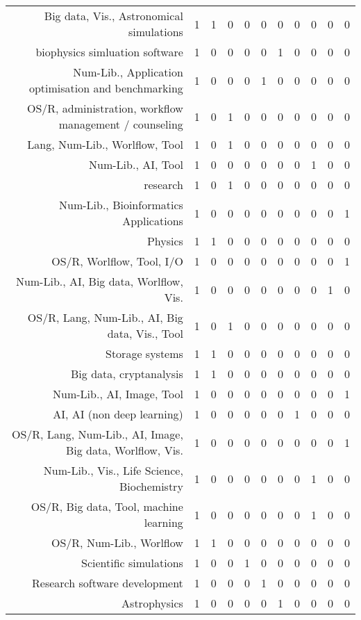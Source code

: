 {\begin{landscape}
\begin{longtable}[htb]{r|c|c|c|c|c|c|c|c|c|c}
{Big data, Vis., Astronomical simulations} & 1 & 1 & 0 & 0 & 0 & 0 & 0 & 0 & 0 & 0 \\%
{biophysics simluation software} & 1 & 0 & 0 & 0 & 0 & 1 & 0 & 0 & 0 & 0 \\%
{Num-Lib., Application optimisation and benchmarking} & 1 & 0 & 0 & 0 & 1 & 0 & 0 & 0 & 0 & 0 \\%
{OS/R, administration, workflow management / counseling} & 1 & 0 & 1 & 0 & 0 & 0 & 0 & 0 & 0 & 0 \\%
{Lang, Num-Lib., Worlflow, Tool} & 1 & 0 & 1 & 0 & 0 & 0 & 0 & 0 & 0 & 0 \\%
{Num-Lib., AI, Tool} & 1 & 0 & 0 & 0 & 0 & 0 & 0 & 1 & 0 & 0 \\%
{research} & 1 & 0 & 1 & 0 & 0 & 0 & 0 & 0 & 0 & 0 \\%
{Num-Lib., Bioinformatics Applications} & 1 & 0 & 0 & 0 & 0 & 0 & 0 & 0 & 0 & 1 \\%
{Physics} & 1 & 1 & 0 & 0 & 0 & 0 & 0 & 0 & 0 & 0 \\%
{OS/R, Worlflow, Tool, I/O} & 1 & 0 & 0 & 0 & 0 & 0 & 0 & 0 & 0 & 1 \\%
{Num-Lib., AI, Big data, Worlflow, Vis.} & 1 & 0 & 0 & 0 & 0 & 0 & 0 & 0 & 1 & 0 \\%
{OS/R, Lang, Num-Lib., AI, Big data, Vis., Tool} & 1 & 0 & 1 & 0 & 0 & 0 & 0 & 0 & 0 & 0 \\%
{Storage systems} & 1 & 1 & 0 & 0 & 0 & 0 & 0 & 0 & 0 & 0 \\%
{Big data, cryptanalysis} & 1 & 1 & 0 & 0 & 0 & 0 & 0 & 0 & 0 & 0 \\%
{Num-Lib., AI, Image, Tool} & 1 & 0 & 0 & 0 & 0 & 0 & 0 & 0 & 0 & 1 \\%
{AI, AI (non deep learning)} & 1 & 0 & 0 & 0 & 0 & 0 & 1 & 0 & 0 & 0 \\%
{OS/R, Lang, Num-Lib., AI, Image, Big data, Worlflow, Vis.} & 1 & 0 & 0 & 0 & 0 & 0 & 0 & 0 & 0 & 1 \\%
{Num-Lib., Vis., Life Science, Biochemistry} & 1 & 0 & 0 & 0 & 0 & 0 & 0 & 1 & 0 & 0 \\%
{OS/R, Big data, Tool, machine learning} & 1 & 0 & 0 & 0 & 0 & 0 & 0 & 1 & 0 & 0 \\%
{OS/R, Num-Lib., Worlflow} & 1 & 1 & 0 & 0 & 0 & 0 & 0 & 0 & 0 & 0 \\%
{Scientific simulations} & 1 & 0 & 0 & 1 & 0 & 0 & 0 & 0 & 0 & 0 \\%
{Research software development} & 1 & 0 & 0 & 0 & 1 & 0 & 0 & 0 & 0 & 0 \\%
{Astrophysics} & 1 & 0 & 0 & 0 & 0 & 1 & 0 & 0 & 0 & 0 \\%

\end{longtable}
\end{landscape}}
